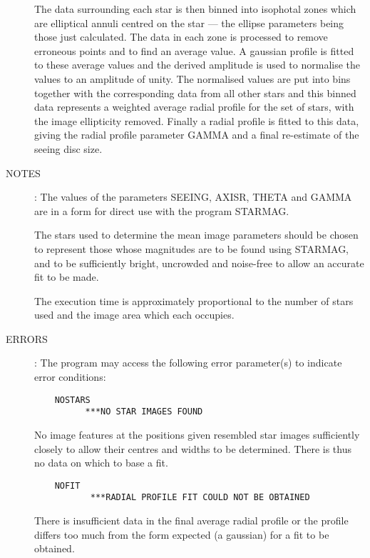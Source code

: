 \begin{description}
The data surrounding each star is then binned into isophotal zones which are
elliptical annuli centred on the star --- the ellipse parameters being those
just calculated.
The data in each zone is processed to remove erroneous points and to find an
average value.
A gaussian profile is fitted to these average values and the derived amplitude
is used to normalise the values to an amplitude of unity.
The normalised values are put into bins together with the corresponding data
from all other stars and this binned data represents a weighted average radial
profile for the set of stars, with the image ellipticity removed.
Finally a radial profile is fitted to this data, giving the radial profile
parameter GAMMA and a final re-estimate of the seeing disc size.
\item [NOTES]:
The values of the parameters SEEING, AXISR, THETA and GAMMA are in a form for
direct use with the program STARMAG.

The stars used to determine the mean image parameters should be chosen to
represent those whose magnitudes are to be found using STARMAG, and to be
sufficiently bright, uncrowded and noise-free to allow an accurate fit to be
made.

The execution time is approximately proportional to the number of stars used
and the image area which each occupies.
\item [ERRORS]:
The program may access the following error parameter(s) to indicate error
conditions:
\begin{verbatim}
    NOSTARS
          ***NO STAR IMAGES FOUND
\end{verbatim}
No image features at the positions given resembled star images sufficiently
closely to allow their centres and widths to be determined.
There is thus no data on which to base a fit.
\begin{verbatim}
    NOFIT
           ***RADIAL PROFILE FIT COULD NOT BE OBTAINED
\end{verbatim}
There is insufficient data in the final average radial profile or the profile
differs too much from the form expected (a gaussian) for a fit to be obtained.
\end{description}

